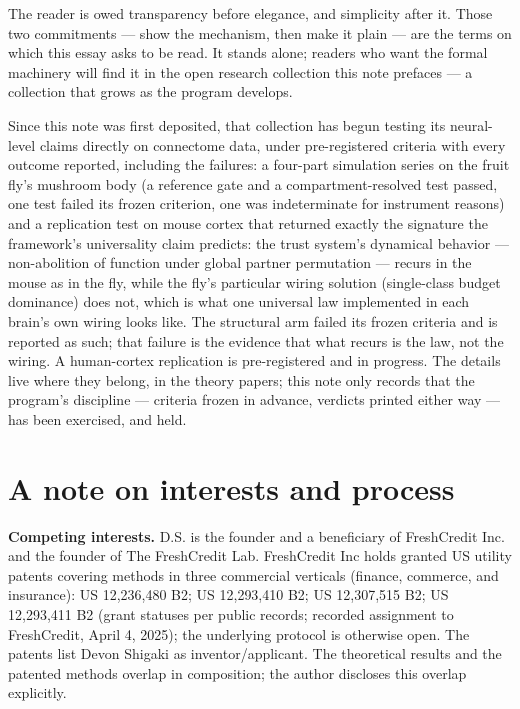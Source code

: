 \documentclass[11pt]{article}
\begin{document}
The reader is owed transparency before elegance, and simplicity after it. Those two commitments --- show the mechanism, then make it plain --- are the terms on which this essay asks to be read. It stands alone; readers who want the formal machinery will find it in the open research collection this note prefaces --- a collection that grows as the program develops.

Since this note was first deposited, that collection has begun testing its neural-level claims directly on connectome data, under pre-registered criteria with every outcome reported, including the failures: a four-part simulation series on the fruit fly's mushroom body (a reference gate and a compartment-resolved test passed, one test failed its frozen criterion, one was indeterminate for instrument reasons) and a replication test on mouse cortex that returned exactly the signature the framework's universality claim predicts: the trust system's dynamical behavior --- non-abolition of function under global partner permutation --- recurs in the mouse as in the fly, while the fly's particular wiring solution (single-class budget dominance) does not, which is what one universal law implemented in each brain's own wiring looks like. The structural arm failed its frozen criteria and is reported as such; that failure is the evidence that what recurs is the law, not the wiring. A human-cortex replication is pre-registered and in progress. The details live where they belong, in the theory papers; this note only records that the program's discipline --- criteria frozen in advance, verdicts printed either way --- has been exercised, and held.

\vspace{1.2em}
\section*{A note on interests and process}

\noindent\textbf{Competing interests.} D.S. is the founder and a beneficiary of FreshCredit Inc. and the founder of The FreshCredit Lab. FreshCredit Inc holds granted US utility patents covering methods in three commercial verticals (finance, commerce, and insurance): US 12,236,480 B2; US 12,293,410 B2; US 12,307,515 B2; US 12,293,411 B2 (grant statuses per public records; recorded assignment to FreshCredit, April 4, 2025); the underlying protocol is otherwise open. The patents list Devon Shigaki as inventor/applicant. The theoretical results and the patented methods overlap in composition; the author discloses this overlap explicitly.
\end{document}
